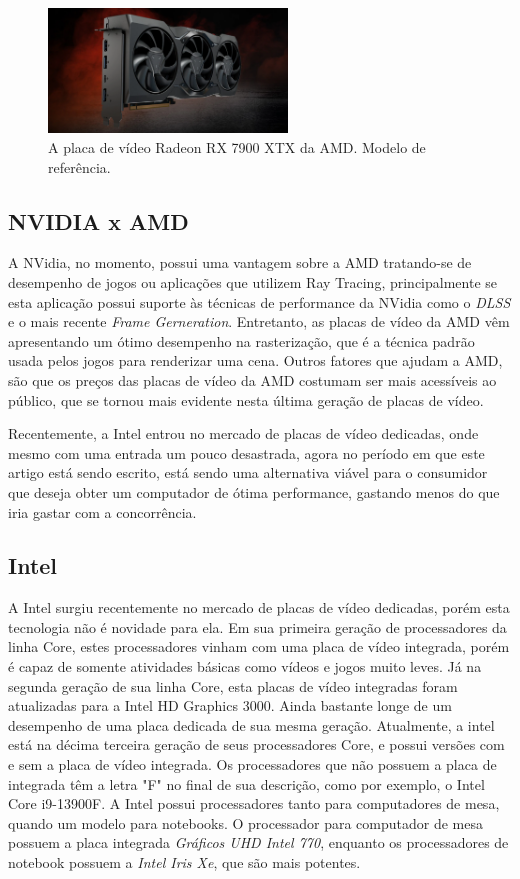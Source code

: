 \documentclass[journal]{IEEEtran}
\begin{document}
\begin{figure}[h]
  \centering
  \includegraphics[width=2.5in]{media/rx7900xtx.png}
  \caption{A placa de vídeo Radeon RX 7900 XTX da AMD. Modelo de referência.}
  \label{img_rx7900xtx}
\end{figure}

\subsection{NVIDIA x AMD}
A NVidia, no momento, possui uma vantagem sobre a AMD tratando-se de desempenho de jogos
ou aplicações que utilizem Ray Tracing, principalmente se esta aplicação possui suporte
às técnicas de performance da NVidia como o \emph{DLSS} e o mais recente \emph{Frame
Gerneration}. Entretanto, as placas de vídeo da AMD vêm apresentando um ótimo desempenho
na rasterização, que é a técnica padrão usada pelos jogos para renderizar uma cena. Outros
fatores que ajudam a AMD, são que os preços das placas de vídeo da AMD costumam ser mais
acessíveis ao público, que se tornou mais evidente nesta última geração de placas de vídeo.

Recentemente, a Intel entrou no mercado de placas de vídeo dedicadas, onde mesmo com uma
entrada um pouco desastrada, agora no período em que este artigo está sendo escrito, está
sendo uma alternativa viável para o consumidor que deseja obter um computador de ótima
performance, gastando menos do que iria gastar com a concorrência.


\subsection{Intel}
A Intel surgiu recentemente no mercado de placas de vídeo dedicadas, porém esta tecnologia
não é novidade para ela. Em sua primeira geração de processadores da linha Core, estes 
processadores vinham com uma placa de vídeo integrada, porém é capaz de somente atividades
básicas como vídeos e jogos muito leves.\cite{c16} Já na segunda geração de sua linha Core,
esta placas de vídeo integradas foram atualizadas para a Intel HD Graphics 3000. \cite{c17}
Ainda bastante longe de um desempenho de uma placa dedicada de sua mesma geração. Atualmente,
a intel está na décima terceira geração de seus processadores Core, e possui versões com e
sem a placa de vídeo integrada. Os processadores que não possuem a placa de integrada têm
a letra "F" no final de sua descrição, como por exemplo, o Intel Core i9-13900F. A Intel
possui processadores tanto para computadores de mesa, quando um modelo para notebooks. O
processador para computador de mesa possuem a placa integrada \emph{Gráficos UHD Intel 770},
enquanto os processadores de notebook possuem a \emph{Intel Iris Xe}, que são mais potentes.
\end{document}
